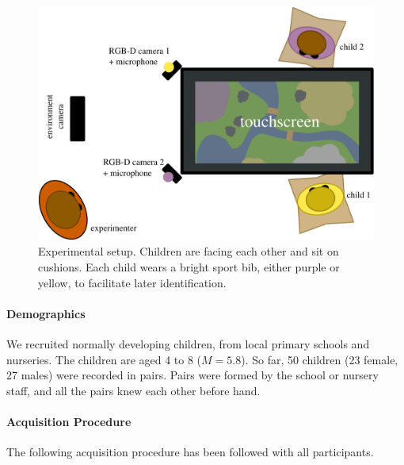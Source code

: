 \documentclass{article}
\begin{document}
\begin{figure}[htbp]
    \centering
    \includegraphics[width=0.8\linewidth]{setup_child_child_top}
    \caption{Experimental setup. Children are facing each other and sit on
    cushions. Each child wears a bright sport bib, either purple or yellow, to
    facilitate later identification.}
    \label{fig|setup}
\end{figure}

\paragraph{Demographics}

We recruited normally developing children, from local primary schools and
nurseries. The children are aged 4 to 8 ($M=5.8$). So far, 50 children (23
female, 27 males) were recorded in pairs. Pairs were formed by the school or
nursery staff, and all the pairs knew each other before hand.

\paragraph{Acquisition Procedure}

The following acquisition procedure has been followed with all participants.
\end{document}

